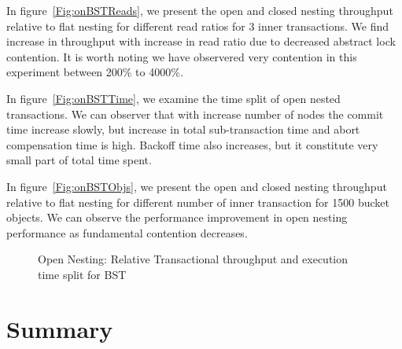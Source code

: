 \documentclass[12pt,english]{report}
\begin{document}
In figure~\ref{Fig:onBSTReads}, we present the open and closed nesting throughput relative to flat nesting for different read ratios for 3 inner transactions. We find increase in throughput with increase in read ratio due to decreased abstract lock contention. It is worth noting we have observered very contention in this experiment between 200\% to 4000\%. 

In figure~\ref{Fig:onBSTTime}, we examine the time split of open nested transactions. We can observer 
that with increase number of nodes the commit time increase slowly, but increase in total sub-transaction time and abort compensation time is high. Backoff time also increases, but it constitute very small part of total time spent.  

In figure~\ref{Fig:onBSTObjs}, we present the open and closed nesting throughput relative to flat nesting for different number of inner transaction for 1500 bucket objects. We can observe the performance improvement in open nesting performance as fundamental contention decreases.

\begin{figure}[H]
\centering
{}
\end{figure}
\begin{figure}[H]
\centering
{}
\end{figure}
\begin{figure}[H]
\centering
{}
\end{figure}
\begin{figure}[H]
\centering
{}
\caption{Open Nesting: Relative Transactional throughput and execution time split for BST}
\label{Fig:cpBSTTable}
\end{figure}

\section{Summary}
\end{document}
